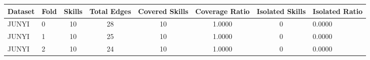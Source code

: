 \begin{tabular}{llcccccl}
\hline
Dataset & Fold & Skills & Total Edges & Covered Skills & Coverage Ratio & Isolated Skills & Isolated Ratio \\
\hline
JUNYI & 0 & 10 & 28 & 10 & 1.0000 & 0 & 0.0000 \\
JUNYI & 1 & 10 & 25 & 10 & 1.0000 & 0 & 0.0000 \\
JUNYI & 2 & 10 & 24 & 10 & 1.0000 & 0 & 0.0000 \\
\hline
\end{tabular}